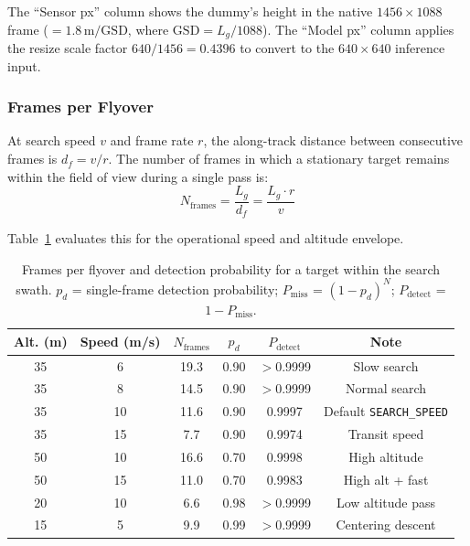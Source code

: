 The ``Sensor px'' column shows the dummy's height in the native $1456 \times 1088$ frame ($= 1.8\,\text{m} / \mathrm{GSD}$, where $\mathrm{GSD} = L_g / 1088$).  The ``Model px'' column applies the resize scale factor $640/1456 = 0.4396$ to convert to the $640 \times 640$ inference input.

\subsubsection{Frames per Flyover}

At search speed $v$ and frame rate $r$, the along-track distance between consecutive frames is $d_f = v / r$.  The number of frames in which a stationary target remains within the field of view during a single pass is:
\begin{equation}
    N_\mathrm{frames} = \frac{L_g}{d_f} = \frac{L_g \cdot r}{v}
    \label{eq:frames_per_flyover}
\end{equation}

Table~\ref{tab:frames_flyover} evaluates this for the operational speed and altitude envelope.

\begin{table}[ht]
  \centering
  \caption{Frames per flyover and detection probability for a target within the search swath.  $p_d$ = single-frame detection probability; $P_\mathrm{miss}$ = $(1 - p_d)^N$; $P_\mathrm{detect}$ = $1 - P_\mathrm{miss}$.}\label{tab:frames_flyover}
  \begin{tabular}{@{}c c c c c c@{}}
    \toprule
    \textbf{Alt. (m)} & \textbf{Speed (m/s)} & $N_\mathrm{frames}$ & $p_d$ & $P_\mathrm{detect}$ & \textbf{Note} \\
    \midrule
    35 &  6 & 19.3 & 0.90 & $>$0.9999 & Slow search \\
    35 &  8 & 14.5 & 0.90 & $>$0.9999 & Normal search \\
    35 & 10 & 11.6 & 0.90 & 0.9997 & Default \texttt{SEARCH\_SPEED} \\
    35 & 15 &  7.7 & 0.90 & 0.9974 & Transit speed \\
    50 & 10 & 16.6 & 0.70 & 0.9998 & High altitude \\
    50 & 15 & 11.0 & 0.70 & 0.9983 & High alt + fast \\
    20 & 10 &  6.6 & 0.98 & $>$0.9999 & Low altitude pass \\
    15 &  5 &  9.9 & 0.99 & $>$0.9999 & Centering descent \\
    \bottomrule
  \end{tabular}
\end{table}

